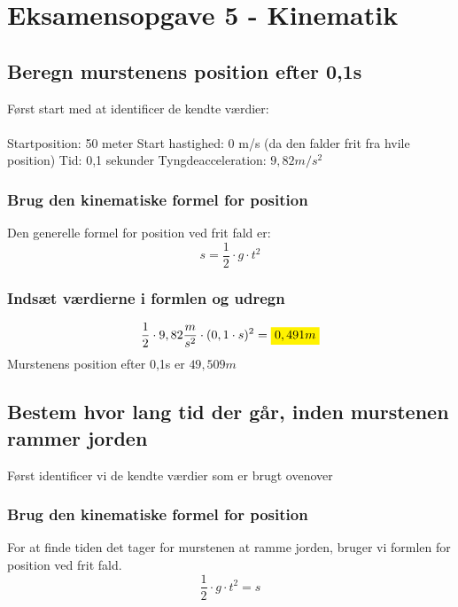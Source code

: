 \newpage
\section{Eksamensopgave 5 - Kinematik}
\subsection{Beregn murstenens position efter 0,1s}
Først start med at identificer de kendte værdier:
\\\\
Startposition: 50 meter \newline
Start hastighed: 0 m/s (da den falder frit fra hvile position)\newline
Tid: 0,1 sekunder \newline
Tyngdeacceleration: \begin{math}9,82m/s^{2}\end{math}


\subsubsection{Brug den kinematiske formel for position}
Den generelle formel for position ved frit fald er:
\begin{equation*}
    s= \frac{1}{2} \cdot g \cdot t^{2}
\end{equation*}

\subsubsection{Indsæt værdierne i formlen og udregn}
\begin{equation*}
    \frac{1}{2} \cdot 9,82 \frac{m}{s^{2}}\cdot (0,1 \cdot s)^{2}= \mathcolorbox{yellow}{0,491m}
\end{equation*}
Murstenens position efter 0,1s er $49,509m$

\subsection{Bestem hvor lang tid der går, inden murstenen rammer jorden}

Først identificer vi de kendte værdier som er brugt ovenover

\subsubsection{Brug den kinematiske formel for position}
For at finde tiden det tager for murstenen at ramme jorden, bruger vi formlen for position ved frit fald.
\begin{equation*}
    \frac{1}{2}\cdot g\cdot t^{2}=s
\end{equation*}

